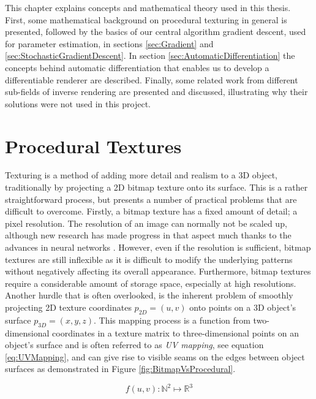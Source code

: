 This chapter explains concepts and mathematical theory used in this thesis. First, some mathematical background on procedural texturing in general is presented, followed by the basics of our central algorithm gradient descent, used for parameter estimation, in sections \ref{sec:Gradient} and \ref{sec:StochasticGradientDescent}. In section \ref{sec:AutomaticDifferentiation} the concepts behind automatic differentiation that enables us to develop a differentiable renderer are described. Finally, some related work from different sub-fields of inverse rendering are presented and discussed, illustrating why their solutions were not used in this project.


\section{Procedural Textures}\label{sec:BackgroundProceduralTextures}

Texturing is a method of adding more detail and realism to a 3D object, traditionally by projecting a 2D bitmap texture onto its surface. This is a rather straightforward process, but presents a number of practical problems that are difficult to overcome. Firstly, a bitmap texture has a fixed amount of detail; a pixel resolution. The resolution of an image can normally not be scaled up, although new research has made progress in that aspect much thanks to the advances in neural networks \cite{richard_2019_learned, li_2019_a}. However, even if the resolution is sufficient, bitmap textures are still inflexible as it is difficult to modify the underlying patterns without negatively affecting its overall appearance. Furthermore, bitmap textures require a considerable amount of storage space, especially at high resolutions. Another hurdle that is often overlooked, is the inherent problem of smoothly projecting 2D texture coordinates $p_{2D} = (u,v)$ onto points on a 3D object's surface $p_{3D} = (x,y,z)$. This mapping process is a function from two-dimensional coordinates in a texture matrix to three-dimensional points on an object's surface and is often referred to as \textit{UV mapping}, see equation \ref{eq:UVMapping}, and can give rise to visible seams on the edges between object surfaces as demonstrated in Figure \ref{fig:BitmapVsProcedural}. 

\begin{equation}\label{eq:UVMapping}
    f(u,v) : \mathbb{N}^2 \mapsto \mathbb{R}^3
\end{equation}

